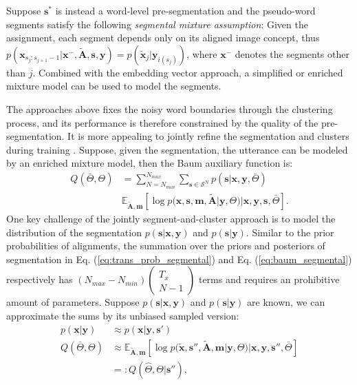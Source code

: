 \documentclass[journal]{IEEEtran}
\begin{document}
Suppose $\mathbf s^*$ is instead a word-level pre-segmentation and the pseudo-word segments satisfy the following \textit{segmental mixture assumption}: Given the assignment, each segment depends only on its aligned image concept, thus $p(\mathbf x_{s_j:s_{j+1}-1}|\mathbf x^{-}, \tilde{\mathbf{A}}, \mathbf s, \mathbf y) = p(\tilde{\mathbf x}_j|\mathbf y_{i(s_j)})$, where $\mathbf x^-$ denotes the segments other than $j$. Combined with the embedding vector approach, a simplified or enriched mixture model can be used to model the segments.

The approaches above fixes the noisy word boundaries through the clustering process, and its performance is therefore constrained by the quality of the pre-segmentation. It is more appealing to jointly refine the segmentation and clusters during training \cite{Kamper2017}. Suppose, given the segmentation, the utterance can be modeled by an enriched mixture model, then the Baum auxiliary function is:
\begin{align}\label{eq:baum_segmental}
    Q(\bar{\Theta}, \Theta) &= \sum_{N=N_{min}}^{N_{max}}\sum_{\mathbf s \in \mathcal S^N}p(\mathbf s|\mathbf x, \mathbf y, \bar{\Theta})\nonumber\\
    &\mathbb{E}_{\tilde{\mathbf A}, \mathbf m}\left[\log p(\mathbf x, \mathbf s, \mathbf m, \tilde{\mathbf A}|\mathbf y, \Theta)|\mathbf x, \mathbf y, \mathbf s , \bar{\Theta}\right].
\end{align}
One key challenge of the jointly segment-and-cluster approach is to model the distribution of the segmentation $p(\mathbf s|\mathbf x, \mathbf y)$ and $p(\mathbf s|\mathbf y)$. Similar to the prior probabilities of alignments, the summation over the priors and posteriors of segmentation in Eq. (\ref{eq:trans_prob_segmental}) and Eq. (\ref{eq:baum_segmental}) respectively has $(N_{max}-N_{min})\left(\begin{array}{c}
      T_x\\
     N-1
\end{array}\right)$ terms and requires an prohibitive amount of parameters. Suppose $p(\mathbf s|\mathbf x, \mathbf y)$ and $p(\mathbf s|\mathbf y)$ are known, we can approximate the sums by its unbiased sampled version:
\begin{align}\label{eq:baum-besgmm-sampled}
    p(\mathbf x|\mathbf y) &\approx p(\mathbf x|\mathbf y, \mathbf s')\\
    Q(\bar{\Theta}, \Theta) &\approx \mathbb{E}_{\tilde{\mathbf A}, \mathbf m}\left[\log p(\tilde{\mathbf x}, \mathbf s'', \tilde{\mathbf A}, \mathbf m|\mathbf y, \Theta)|\mathbf x, \mathbf y, \mathbf s'', \bar{\Theta}\right] \\
    &=: Q(\hat{\Theta}, \Theta|\mathbf s''),
\end{align}
\end{document}
